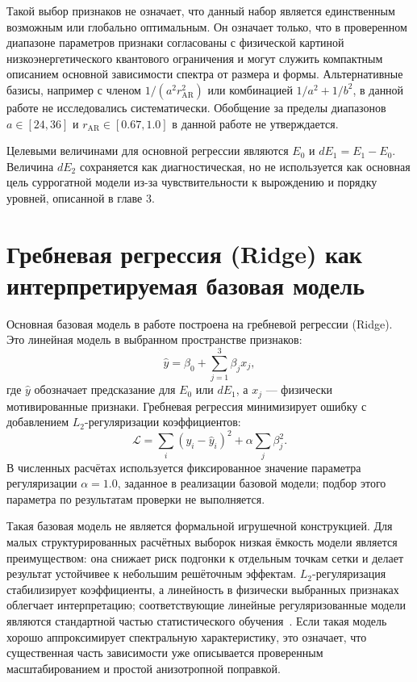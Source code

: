 Такой выбор признаков не означает, что данный набор является единственным возможным или
глобально оптимальным. Он означает только, что в проверенном диапазоне параметров признаки
согласованы с физической картиной низкоэнергетического квантового ограничения и могут
служить компактным описанием основной зависимости спектра от размера и формы.
Альтернативные базисы, например с членом $1/(a^2 r_{\mathrm{AR}}^2)$ или комбинацией
$1/a^2 + 1/b^2$, в данной работе не исследовались систематически. Обобщение за пределы
диапазонов $a \in [24,36]$ и $r_{\mathrm{AR}} \in [0.67,1.0]$ в данной работе не
утверждается.

Целевыми величинами для основной регрессии являются $E_0$ и $dE_1=E_1-E_0$. Величина
$dE_2$ сохраняется как диагностическая, но не используется как основная цель суррогатной
модели из-за чувствительности к вырождению и порядку уровней, описанной в главе 3.

\section{Гребневая регрессия \texorpdfstring{(Ridge)}{(Ridge)} как интерпретируемая
базовая модель}

Основная базовая модель в работе построена на гребневой регрессии (Ridge). Это линейная
модель в выбранном пространстве признаков:
\begin{equation}
  \hat{y}
  =
  \beta_0
  +
  \sum_{j=1}^{3} \beta_j x_j ,
\end{equation}
где $\hat{y}$ обозначает предсказание для $E_0$ или $dE_1$, а $x_j$ --- физически
мотивированные признаки. Гребневая регрессия минимизирует ошибку с добавлением
$L_2$-регуляризации коэффициентов:
\begin{equation}
  \mathcal{L}
  =
  \sum_i \left(y_i-\hat{y}_i\right)^2
  +
  \alpha \sum_j \beta_j^2 .
\end{equation}
В численных расчётах используется фиксированное значение параметра регуляризации
$\alpha=1.0$, заданное в реализации базовой модели; подбор этого параметра по результатам
проверки не выполняется.

Такая базовая модель не является формальной игрушечной конструкцией. Для малых
структурированных расчётных выборок низкая ёмкость модели является преимуществом: она
снижает риск подгонки к отдельным точкам сетки и делает результат устойчивее к небольшим
решёточным эффектам. $L_2$-регуляризация стабилизирует коэффициенты, а линейность в
физически выбранных признаках облегчает интерпретацию; соответствующие линейные
регуляризованные модели являются стандартной частью статистического
обучения~\cite{hastie2009elements}. Если такая модель хорошо аппроксимирует спектральную
характеристику, это означает, что существенная часть зависимости уже описывается
проверенным масштабированием и простой анизотропной поправкой.

